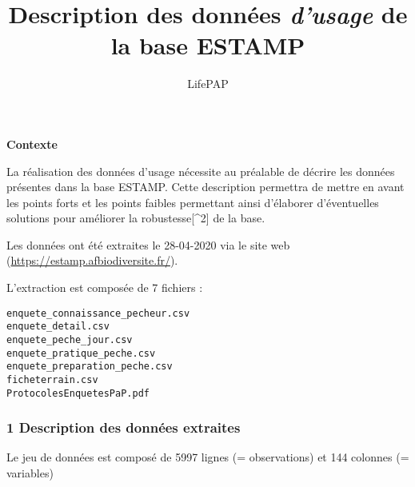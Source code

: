 \documentclass[]{article}
\title{Description des données \emph{d'usage} de la base ESTAMP}
\subtitle{LifePAP}
\author{}
\date{\vspace{-2.5em}}
\begin{document}
\maketitle

{
\setcounter{tocdepth}{5}
\tableofcontents
}
\textbf{Contexte}

La réalisation des données d'usage nécessite au préalable de décrire les
données présentes dans la base ESTAMP. Cette description permettra de
mettre en avant les points forts et les points faibles permettant ainsi
d'élaborer d'éventuelles solutions pour améliorer la
robustesse{[}\^{}2{]} de la base.

Les données ont été extraites le 28-04-2020 via le site web
(\url{https://estamp.afbiodiversite.fr/}).

L'extraction est composée de 7 fichiers :

\begin{verbatim}
enquete_connaissance_pecheur.csv 
enquete_detail.csv 
enquete_peche_jour.csv 
enquete_pratique_peche.csv 
enquete_preparation_peche.csv 
ficheterrain.csv 
ProtocolesEnquetesPaP.pdf
\end{verbatim}

\hypertarget{description-des-donnuxe9es-extraites}{%
\subsubsection{\texorpdfstring{\textbf{1 Description des données
extraites}}{1 Description des données extraites}}\label{description-des-donnuxe9es-extraites}}

Le jeu de données est composé de 5997 lignes (= observations) et 144
colonnes (= variables)
\end{document}
